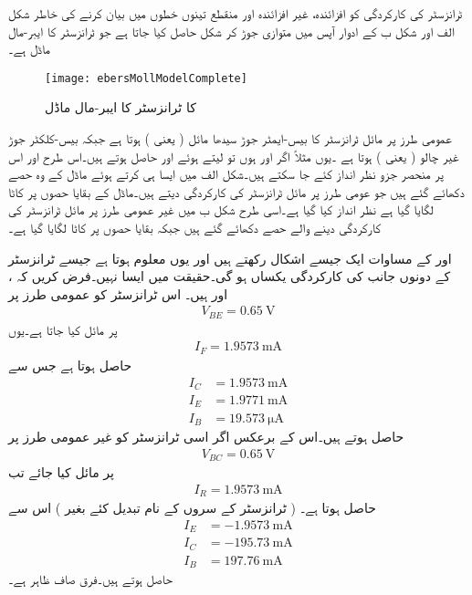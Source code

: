  ٹرانزسٹر کی کارکردگی کو افزائندہ، غیر افزائندہ اور منقطع تینوں خطوں میں بیان کرنے کی خاطر شکل  الف اور شکل  ب  کے ادوار آپس میں متوازی جوڑ کر شکل   حاصل کیا جاتا ہے جو  ٹرانزسٹر کا ایبر-مال ماڈل ہے۔
\begin{figure}
\centering
\texttt{[image: ebersMollModelComplete]}
\caption{ کا ٹرانزسٹر کا ایبر-مال ماڈل}
\label{شکل_مکمل_ایبر_مال_ماڈل}
\end{figure}
عمومی طرز پر مائل ٹرانزسٹر کا بیس-ایمٹر  جوڑ سیدھا مائل ( یعنی ) ہوتا ہے جبکہ بیس-کلکٹر جوڑ غیر چالو ( یعنی ) ہوتا ہے ۔یوں مثلاً اگر  اور  ہوں تو   لیتے ہوئے  اور  حاصل ہوتے ہیں۔اس طرح  اور اس پر منحصر جزو نظر انداز کئے جا سکتے ہیں۔شکل  الف میں ایسا ہی کرتے ہوئے ماڈل کے وہ حصے دکھائے گئے ہیں جو عومی طرز پر مائل  ٹرانزسٹر کی کارکردگی دیتے ہیں۔ماڈل کے بقایا حصوں پر کاٹا لگایا گیا ہے نظر انداز کیا گیا ہے۔اسی طرح شکل  ب میں غیر عمومی طرز پر مائل ٹرانزسٹر کی کارکردگی دینے والے حصے دکھائے گئے ہیں جبکہ بقایا حصوں پر کاٹا لگایا گیا ہے۔

اور  کے مساوات ایک جیسے  اشکال رکھتے ہیں اور یوں معلوم ہوتا ہے جیسے ٹرانزسٹر کے دونوں جانب کی کارکردگی یکساں ہو گی۔حقیقت میں ایسا نہیں۔فرض کریں کہ ،  اور  ہیں۔ اس ٹرانزسٹر کو عمومی طرز پر
\begin{align*}
V_{BE}=\SI{0.65}{\volt}
\end{align*}
پر مائل کیا جاتا ہے۔یوں
\begin{align*}
I_F=\SI{1.9573}{\milli \ampere}
\end{align*}
 حاصل ہوتا ہے جس سے
\begin{align*}
I_C &=\SI{1.9573}{\milli \ampere}\\
I_E&=\SI{1.9771}{\milli \ampere}\\
I_B&=\SI{19.573}{\micro \ampere}
\end{align*}
حاصل ہوتے ہیں۔اس کے برعکس اگر اسی ٹرانزسٹر کو غیر عمومی طرز پر
\begin{align*}
V_{BC}=\SI{0.65}{\volt}
\end{align*}
پر مائل کیا جائے تب 
\begin{align*}
I_R=\SI{1.9573}{\milli \ampere}
\end{align*}
حاصل ہوتا ہے۔ ( ٹرانزسٹر کے سروں کے نام تبدیل کئے بغیر ) اس سے
\begin{align*}
I_E&=\SI{-1.9573}{\milli \ampere}\\
I_C&=\SI{-195.73}{\milli \ampere} \\
I_B&=\SI{197.76}{\milli \ampere}
\end{align*}
حاصل ہوتے ہیں۔فرق صاف ظاہر ہے۔

